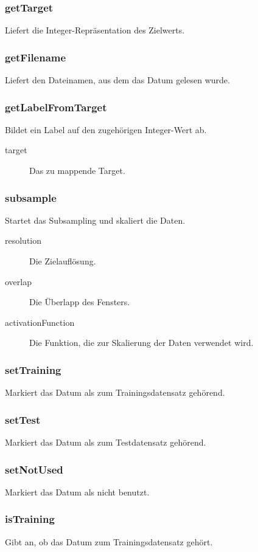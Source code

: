 \documentclass[a4paper,10pt]{scrartcl}
\begin{document}
\subsubsection{getTarget}
Liefert die Integer-Repräsentation des Zielwerts.

\subsubsection{getFilename}
Liefert den Dateinamen, aus dem das Datum gelesen wurde.

\subsubsection{getLabelFromTarget}
Bildet ein Label auf den zugehörigen Integer-Wert ab.
\begin{description}
\item[target] Das zu mappende Target.
\end{description}

\subsubsection{subsample}
Startet das Subsampling und skaliert die Daten.
\begin{description}
\item[resolution] Die Zielauflösung.
\item[overlap] Die Überlapp des Fensters.
\item[activationFunction] Die Funktion, die zur Skalierung der Daten verwendet wird.
\end{description}

\subsubsection{setTraining}
Markiert das Datum als zum Trainingsdatensatz gehörend.

\subsubsection{setTest}
Markiert das Datum als zum Testdatensatz gehörend.

\subsubsection{setNotUsed}
Markiert das Datum als nicht benutzt.

\subsubsection{isTraining}
Gibt an, ob das Datum zum Trainingsdatensatz gehört.
\end{document}
